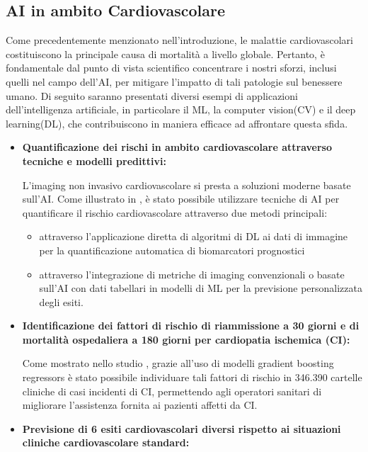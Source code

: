 \subsection{AI in ambito Cardiovascolare}
Come precedentemente menzionato nell'introduzione, le malattie cardiovascolari costituiscono la principale causa di mortalità a livello globale. Pertanto, è fondamentale dal punto di vista scientifico concentrare i nostri sforzi, inclusi quelli nel campo dell'AI, per mitigare l'impatto di tali patologie sul benessere umano. Di seguito saranno presentati diversi esempi di applicazioni dell'intelligenza artificiale, in particolare il ML, la computer vision(CV) e il deep learning(DL), che contribuiscono in maniera efficace ad affrontare questa sfida.
\begin{itemize}
    \item \textbf{Quantificazione dei rischi in ambito cardiovascolare attraverso tecniche e modelli predittivi: }
    
    L'imaging non invasivo cardiovascolare si presta a soluzioni moderne basate sull'AI. Come illustrato %
    in \cite{CVDex1}, è stato possibile utilizzare tecniche di AI per quantificare il rischio cardiovascolare attraverso due metodi principali: 
    \begin{itemize}
        \item attraverso l'applicazione diretta di algoritmi di DL ai dati di immagine per la quantificazione automatica di biomarcatori prognostici
        \item attraverso l'integrazione di metriche di imaging convenzionali o basate sull'AI con dati tabellari in modelli di ML per la previsione personalizzata degli esiti.
    \end{itemize}
    \item \textbf{Identificazione dei fattori di rischio di riammissione a 30 giorni e di mortalità ospedaliera a 180 giorni per cardiopatia ischemica (CI):} 
    
    Come mostrato nello studio \cite{AIcardio2}, grazie all'uso di modelli gradient boosting regressors è stato possibile individuare tali fattori di rischio in 346.390 cartelle cliniche di casi incidenti di CI, permettendo agli operatori sanitari di migliorare l'assistenza fornita ai pazienti affetti da CI. 

    \item \textbf{Previsione di 6 esiti cardiovascolari diversi rispetto ai situazioni cliniche cardiovascolare standard:}


\end{itemize}

